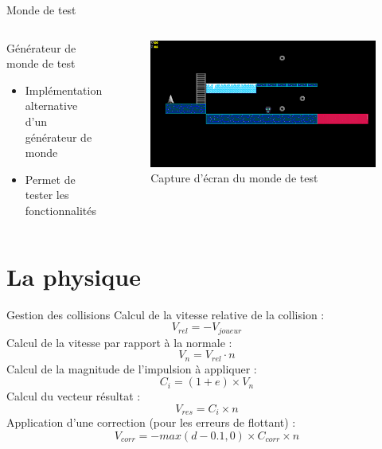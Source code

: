 \documentclass{beamer}
\begin{document}
{\begin{frame}{Monde de test}
    \begin{columns}
        \begin{block}{Générateur de monde de test}
            \begin{itemize}
                \item[\bullet] Implémentation alternative d'un générateur de monde
                \item[\bullet] Permet de tester les fonctionnalités
            \end{itemize}
        \end{block}
        \begin{figure}
            \centering
            \includegraphics[width=1.0\textwidth]{images/test_world}
            \caption{Capture d'écran du monde de test}
        \end{figure}
    \end{columns}
\end{frame}

\section{La physique}
\begin{frame}{Gestion des collisions}
    Calcul de la vitesse relative de la collision :
    \[ V_{rel} =  - V_{joueur} \]
    Calcul de la vitesse par rapport à la normale :
    \[ V_{n} = V_{rel} \cdot n \]
    Calcul de la magnitude de l'impulsion à appliquer :
    \[ C_{i} = (1 + e) \times V_{n} \]
    Calcul du vecteur résultat :
    \[V_{res} = C_{i} \times n \]
    Application d'une correction (pour les erreurs de flottant) :
    \[V_{corr} = -max(d-0.1,0) \times C_{corr} \times n\]
\end{frame}

}
\end{document}
